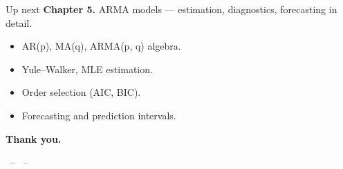 \documentclass[aspectratio=169]{beamer}
\begin{document}
\begin{frame}{Up next}
  \textbf{Chapter 5.} ARMA models — estimation, diagnostics,
  forecasting in detail.
  \medskip
  \begin{itemize}
    \item AR(p), MA(q), ARMA(p, q) algebra.
    \item Yule--Walker, MLE estimation.
    \item Order selection (AIC, BIC).
    \item Forecasting and prediction intervals.
  \end{itemize}
  \medskip
  \begin{center}\Large\bfseries Thank you.\end{center}
  \begin{center}\footnotesize\auteurNom\ -- \auteurEmail\ -- \auteurInstitution\end{center}
\end{frame}
\end{document}
